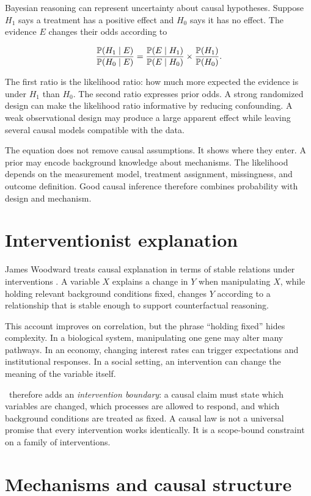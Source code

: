 Bayesian reasoning can represent uncertainty about causal hypotheses. Suppose
\(H_1\) says a treatment has a positive effect and \(H_0\) says it has no effect.
The evidence \(E\) changes their odds according to

\[
  \frac{\mathbb{P}(H_1\mid E)}{\mathbb{P}(H_0\mid E)}
  =
  \frac{\mathbb{P}(E\mid H_1)}{\mathbb{P}(E\mid H_0)}
  \times
  \frac{\mathbb{P}(H_1)}{\mathbb{P}(H_0)}.
\]

The first ratio is the likelihood ratio: how much more expected the evidence
is under \(H_1\) than \(H_0\). The second ratio expresses prior odds. A strong
randomized design can make the likelihood ratio informative by reducing
confounding. A weak observational design may produce a large apparent effect
while leaving several causal models compatible with the data.

The equation does not remove causal assumptions. It shows where they enter. A
prior may encode background knowledge about mechanisms. The likelihood depends
on the measurement model, treatment assignment, missingness, and outcome
definition. Good causal inference therefore combines probability with design
and mechanism.

\section{Interventionist explanation}

James Woodward treats causal explanation in terms of stable relations under
interventions \citep{woodward2003}. A variable \(X\) explains a change in \(Y\)
when manipulating \(X\), while holding relevant background conditions fixed,
changes \(Y\) according to a relationship that is stable enough to support
counterfactual reasoning.

This account improves on correlation, but the phrase \enquote{holding fixed}
hides complexity. In a biological system, manipulating one gene may alter many
pathways. In an economy, changing interest rates can trigger expectations and
institutional responses. In a social setting, an intervention can change the
meaning of the variable itself.

\RCR\ therefore adds an \emph{intervention boundary}: a causal claim must state
which variables are changed, which processes are allowed to respond, and which
background conditions are treated as fixed. A causal law is not a universal
promise that every intervention works identically. It is a scope-bound
constraint on a family of interventions.

\section{Mechanisms and causal structure}

